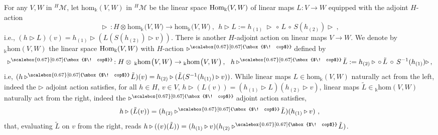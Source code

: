 \documentclass[12pt]{article}
\numberwithin{equation}{section}
\theoremstyle{plain}
\theoremstyle{definition}
\theoremstyle{remark}
\def\MMM{\mathscr{M}}
\def\ra{\triangleright}
\def\RA{\ra}
\def\cop{{{\scalebox{0.67}[0.67]{\mbox{$\! cop$}}}\!}}
\def\hom{\mathrm{hom}}
\def\hxi{h}
\begin{document}
For any $V,W$ in ${}^H\MMM$,  let 
$\hom_\Bbbk(V,W)$ in ${}^H\MMM$ be the linear space
${\rm Hom}_{\Bbbk}(V,W)$ of linear maps  $L : V\to W$ 
 equipped with the  adjoint $H$-action
\begin{equation}\label{adjact}
\RA_{\,} : H \otimes^{} {\hom_\Bbbk}^{}\big({V}, {W}\big) \rightarrow 
 {\hom_\Bbbk}^{}\big({V}, {W}\big)~, ~~
 h\RA L:=h_{(1)}\!\: \ra\,\circ \,L \,\circ\, S(h_{(2)})\ra ~\!, 
\end{equation}
i.e., $(h\RA L)(v)= h_{(1)} \ra (L(S(h_{(2)})\ra v))$. There is another 
$H$-adjoint action
on linear maps
$V\to W$. We denote 
by ${}_\Bbbk\hom(V,W)$ the linear space ${\rm Hom}_{\Bbbk}(V,W)$
with $H$-action $\RA^\cop$ defined by
\begin{equation}\label{copadjact}
\RA_{\,}^\cop : H \otimes^{} {{\,}_\Bbbk\hom}^{}\big({V}, {W}\big) \rightarrow 
 {{}_\Bbbk\hom}^{}\big({V}, {W}\big)~\!, ~~
 \hxi\RA^\cop \tilde L:=\hxi_{(2)}
\ra \, \circ \,\tilde L \,\circ\, S^{-1}(\hxi_{(1)}) \ra ~\!,
\end{equation}
i.e, $
(h\ra^\cop\tilde L)(v)=\hxi_{(2)}
\ra (\tilde L(S^{-1}(\hxi_{(1)}) \ra v))
$.
 While linear maps 
$L\in \hom_\Bbbk(V,W)$ naturally act from the left, indeed the $\RA$ adjoint
action satisfies, for all $\hxi \in H$, $v\in V$, $\hxi\ra
(L(v))=(\hxi_{(1)}\RA L)(\hxi_{(2)}\ra v)$, linear maps 
$\tilde L\in {}_\Bbbk\hom(V,W)$ naturally act from the right, indeed the $\RA^\cop$ adjoint
action satisfies, 
\begin{equation}\label{copadjact2}
\hxi\ra
(\tilde L(v))=(\hxi_{(2)}\RA^\cop \tilde L)(\hxi_{(1)}\ra v)~,
\end{equation}
 that, evaluating
$\tilde L$ on $v$ from  the right, reads $\hxi\ra((v)(\tilde L))=(\hxi_{(1)}\ra
v) (\hxi_{(2)}\RA^\cop \tilde L)$. 
\\
\end{document}
